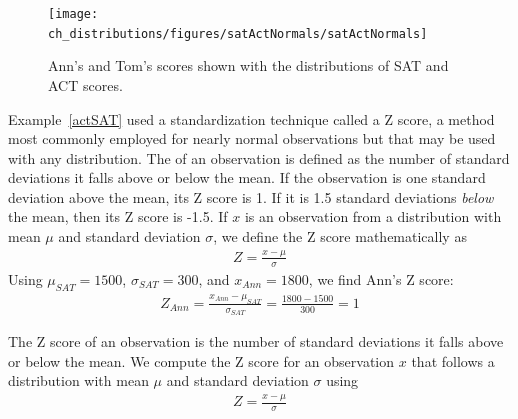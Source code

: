 \begin{figure}
\centering
\texttt{[image: ch\_distributions/figures/satActNormals/satActNormals]}
\caption{Ann's and Tom's scores shown with the distributions of SAT and ACT scores.}
\label{satActNormals}
\end{figure}

Example~\ref{actSAT} used a standardization technique called a Z score, a method most commonly employed for nearly normal observations but that may be used with any distribution. The  of an observation is defined as the number of standard deviations it falls above or below the mean. If the observation is one standard deviation above the mean, its Z score is 1. If it is 1.5 standard deviations \emph{below} the mean, then its Z score is -1.5. If $x$ is an observation from a distribution with mean $\mu$ and standard deviation $\sigma$, we define the Z score mathematically as
\begin{eqnarray*}
Z = \frac{x-\mu}{\sigma}
\end{eqnarray*}
Using $\mu_{SAT}=1500$, $\sigma_{SAT}=300$, and $x_{Ann}=1800$, we find Ann's Z score:
\begin{eqnarray*}
Z_{Ann} = \frac{x_{Ann} - \mu_{SAT}}{\sigma_{SAT}} = \frac{1800-1500}{300} = 1
\end{eqnarray*}

\begin{termBox}{
The Z score of an observation is the number of standard deviations it falls above or below the mean. We compute the Z score for an observation $x$ that follows a distribution with mean $\mu$ and standard deviation $\sigma$ using
\begin{eqnarray*}
Z = \frac{x-\mu}{\sigma}
\end{eqnarray*}}
\end{termBox}

